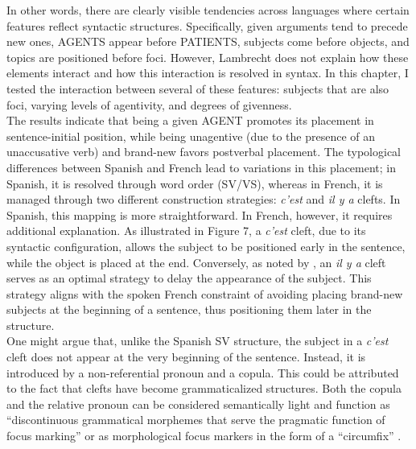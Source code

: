 In other words, there are clearly visible tendencies across languages where certain features reflect syntactic structures. Specifically, given arguments tend to precede new ones, {\selectfont AGENTS} appear before {\selectfont PATIENTS}, subjects come before objects, and topics are positioned before foci. However, Lambrecht does not explain how these elements interact and how this interaction is resolved in syntax.
In this chapter, I tested the interaction between several of these features: subjects that are also foci, varying levels of agentivity, and degrees of givenness.\\
The results indicate that being a given {\selectfont AGENT} promotes its placement in sentence-initial position, while being unagentive (due to the presence of an unaccusative verb) and brand-new favors postverbal placement. The typological differences between Spanish and French lead to variations in this placement; in Spanish, it is resolved through word order (SV/VS), whereas in French, it is managed through two different construction strategies: \textit{c'est} and \textit{il y a} clefts.
In Spanish, this mapping is more straightforward. In French, however, it requires additional explanation. As illustrated in Figure 7, a \textit{c'est} cleft, due to its syntactic configuration, allows the subject to be positioned early in the sentence, while the object is placed at the end. Conversely, as noted by \textcite{lambrecht2010constraints}, an \textit{il y a} cleft serves as an optimal strategy to delay the appearance of the subject. This strategy aligns with the spoken French constraint of avoiding placing brand-new subjects at the beginning of a sentence, thus positioning them later in the structure.\\
One might argue that, unlike the Spanish SV structure, the subject in a \textit{c'est} cleft does not appear at the very beginning of the sentence. Instead, it is introduced by a non-referential pronoun and a copula. This could be attributed to the fact that clefts have become grammaticalized structures. Both the copula and the relative pronoun can be considered semantically light and function as ``discontinuous grammatical morphemes that serve the pragmatic function of focus marking” \parencite[197]{wehr2011phrase} or as morphological focus markers in the form of a ``circumfix” \parencite[126]{haase2000franzosische}.

